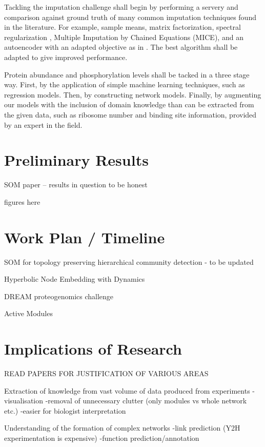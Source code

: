 \documentclass{report}
\begin{document}
	Tackling the imputation challenge shall begin by performing a servery and comparison against ground truth of many common imputation techniques found in the literature. For example, sample means, matrix factorization, spectral regularization \cite{mazumder2010spectral}, Multiple Imputation by Chained Equations (MICE), and an autoencoder with an adapted objective as in \cite{beaulieu2016missing}. The best algorithm shall be adapted to give improved performance.
	
	Protein abundance and phosphorylation levels shall be tacked in a three stage way. First, by the application of simple machine learning techniques, such as regression models. Then, by constructing network models. Finally, by augmenting our models with the inclusion of domain knowledge than can be extracted from the given data, such as ribosome number and binding site information, provided by an expert in the field. 
	
	\chapter{Preliminary Results}
	
	SOM paper -- results in question to be honest
	
	figures here
	
	
	\chapter{Work Plan / Timeline}
	
	SOM for topology preserving hierarchical community detection
	- to be updated 
	
	Hyperbolic Node Embedding with Dynamics
	
	DREAM proteogenomics challenge
	
	Active Modules 
	
	
	
	\chapter{Implications of Research}
	
	READ PAPERS FOR JUSTIFICATION OF VARIOUS AREAS
	
	Extraction of knowledge from vast volume of data produced from experiments
	-visualisation
	-removal of unnecessary clutter (only modules vs whole network etc.)
	-easier for biologist interpretation
	
	Understanding of the formation of complex networks
	-link prediction (Y2H experimentation is expensive)
	-function prediction/annotation
	
\end{document}
